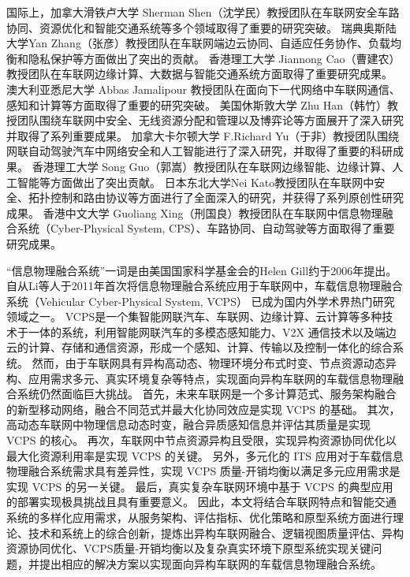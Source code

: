 国际上，加拿大滑铁卢大学 Sherman Shen（沈学民）教授团队在车联网安全车路协同、资源优化和智能交通系统等多个领域取得了重要的研究突破。
瑞典奥斯陆大学Yan Zhang（张彦）教授团队在车联网端边云协同、自适应任务协作、负载均衡和隐私保护等方面做出了突出的贡献。
香港理工大学 Jiannong Cao（曹建农）教授团队在车联网边缘计算、大数据与智能交通系统方面取得了重要研究成果。
澳大利亚悉尼大学 Abbas Jamalipour 教授团队在面向下一代网络中车联网通信、感知和计算等方面取得了重要的研究突破。
美国休斯敦大学 Zhu Han（韩竹）教授团队围绕车联网中安全、无线资源分配和管理以及博弈论等方面展开了深入研究并取得了系列重要成果。
加拿大卡尔顿大学 F.Richard Yu（于非）教授团队围绕网联自动驾驶汽车中网络安全和人工智能进行了深入研究，并取得了重要的科研成果。
香港理工大学 Song Guo（郭嵩）教授团队在车联网边缘智能、边缘计算、人工智能等方面做出了突出贡献。
日本东北大学Nei Kato教授团队在车联网中安全、拓扑控制和路由协议等方面进行了全面深入的研究，并获得了系列原创性研究成果。
香港中文大学 Guoliang Xing（刑国良）教授团队在车联网中信息物理融合系统（Cyber-Physical System, CPS）、车路协同、自动驾驶等方面取得了重要研究成果。

“信息物理融合系统”一词是由美国国家科学基金会的Helen Gill约于2006年提出\cite{lee2016introduction}。
自从Li等人\cite{li2011human}于2011年首次将信息物理融合系统应用于车联网中，车载信息物理融合系统（Vehicular Cyber-Physical System, VCPS）\cite{xia2019zi} 已成为国内外学术界热门研究领域之一。
VCPS是一个集智能网联汽车、车联网、边缘计算、云计算等多种技术于一体的系统，利用智能网联汽车的多模态感知能力、V2X 通信技术以及端边云的计算、存储和通信资源，形成一个感知、计算、传输以及控制一体化的综合系统。
然而，由于车联网具有异构高动态、物理环境分布式时变、节点资源动态异构、应用需求多元、真实环境复杂等特点，实现面向异构车联网的车载信息物理融合系统仍然面临巨大挑战。
首先，未来车联网是一个多计算范式、服务架构融合的新型移动网络，融合不同范式并最大化协同效应是实现 VCPS 的基础。
其次，高动态车联网中物理信息动态时变，融合异质感知信息并评估其质量是实现 VCPS 的核心。
再次，车联网中节点资源异构且受限，实现异构资源协同优化以最大化资源利用率是实现 VCPS 的关键。
另外，多元化的 ITS 应用对于车载信息物理融合系统需求具有差异性，实现 VCPS 质量-开销均衡以满足多元应用需求是实现 VCPS 的另一关键。
最后，真实复杂车联网环境中基于 VCPS 的典型应用的部署实现极具挑战且具有重要意义。
因此，本文将结合车联网特点和智能交通系统的多样化应用需求，从服务架构、评估指标、优化策略和原型系统方面进行理论、技术和系统上的综合创新，提炼出异构车联网融合、逻辑视图质量评估、异构资源协同优化、VCPS质量-开销均衡以及复杂真实环境下原型系统实现关键问题，并提出相应的解决方案以实现面向异构车联网的车载信息物理融合系统。

